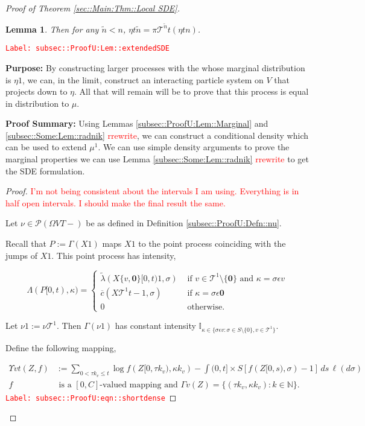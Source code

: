 \documentclass[12pt]{article}
\newcommand{\mb}{\mathbb}
\newcommand{\mc}{\mathcal}
\newcommand{\ov}{\overline}
\newcommand{\te}{\text}
\newcommand{\ep}{\epsilon}
\newcommand{\tr}{\textcolor{red}}
\newcommand{\labe}[1]{\tr{\texttt{Label: #1}}}
\newcommand{\purpose}{\textbf{Purpose: }}
\newcommand{\pfsum}{\textbf{Proof Summary: }}
\newcommand{\ind}{\hspace{24pt}}
\newcommand{\defeq}{:=}								%
\newcommand{\pmsr}{\mc{P}}							%
\renewcommand{\root}{\mathbf{0}}				%
\renewcommand{\v}{v}							%
\renewcommand{\S}{S}							%
\newcommand{\s}{\sigma}							%
\newcommand{\ev}{\ep}							%
\newcommand{\T}{T}								%
\renewcommand{\t}{t}							%
\newcommand{\proj}{\pi}							%
\renewcommand{\tt}{s}							%
\newcommand{\X}{X}								%
\newcommand{\const}{C}							%
\newcommand{\IGrg}{\ov{c}}						%
\newcommand{\tree}{\mc{T}}						%
\newcommand{\sln}[1]{^{#1}}						%
\newcommand{\Sm}{\ell}							%
\newcommand{\alt}[1]{\widetilde{#1}}			%
\newcommand{\m}{\mu}							%
\newcommand{\mm}{\nu}							%
\newcommand{\mmm}{\eta}							%
\newcommand{\XXX}{Z}							%
\newcommand{\rt}{\tau}							%
\renewcommand{\it}{k}							%
\newcommand{\pmap}{\Gamma}						%
\renewcommand{\mark}{\kappa}					%
\newcommand{\rp}{P}								%
\newcommand{\ratee}{\Lambda}					%
\newcommand{\crate}{\alt{\lambda}}				%
\newcommand{\ds}{\Upsilon}						%
\newtheorem{lem}[thms]{Lemma}
\begin{document}
\begin{proof}[Proof of Theorem \ref{sec::Main:Thm::Local SDE}]
\begin{lem}
Then for any \(\alt{n} < n\), \(\mmm{}{\t}{\alt{n}} = \proj{\tree\sln{\alt{n}}}{\t}(\mmm{}{\t}{n})\).
\label{subsec::ProofU:Lem::extendedSDE}
\end{lem}
\labe{subsec::ProofU:Lem::extendedSDE}

\purpose By constructing larger processes with the whose marginal distribution is \(\mmm{}{}{1}\), we can, in the limit, construct an interacting particle system on \(V\) that projects down to \(\mmm{}{}{}\). All that will remain will be to prove that this process is equal in distribution to \(\m{}{}{}\).

\pfsum Using Lemmas \ref{subsec::ProofU:Lem::Marginal} and \ref{subsec::Some:Lem::radnik} \tr{rrewrite}, we can construct a conditional density which can be used to extend \(\mu\sln{1}\). We can use simple density arguments to prove the marginal properties we can use Lemma \ref{subsec::Some:Lem::radnik} \tr{rrewrite} to get the SDE formulation.

\begin{proof}
\tr{I'm not being consistent about the intervals I am using. Everything is in half open intervals. I should make the final result the same.}

Let \(\mm{}{}{} \in \pmsr(\Omega{V}{\T-})\) be as defined in Definition \ref{subsec::ProofU:Defn::nu}.

\ind Recall that \(\rp{} \defeq \pmap{}(\X{}{}{1})\) maps \(\X{}{}{1}\) to the point process coinciding with the jumps of \(\X{}{}{1}\). This point process has intensity,

\[\ratee{}(\rp{}[0,\t),\mark{}) = \begin{cases}
\crate{}{}(\X{\{\v,\root\}}{[0,\t)}{1},\s) &\te{ if } \v\in \tree\sln{1}\setminus\{\root\}\te{ and } \mark{} = \s\ev{\v}\\
\IGrg{}(\X{\tree\sln{1}}{\t-}{1},\s) &\te{ if } \mark{} = \s\ev{\root}\\
0 &\te{ otherwise}.
\end{cases}\]

Let \(\mm{}{}{1} \defeq \mm{\tree\sln{1}}{}{}\). Then \(\pmap{}(\mm{}{}{1})\) has constant intensity \(\mb{I}_{\kappa \in\{\s\ev{\v}:\s\in\S\setminus\{0\},\v\in\tree\sln{1}\}}\). 

\ind Define the following mapping,

\begin{align}
\ds{\v}{\t}(\XXX{}{},f) &\defeq \sum_{0 < \rt{\it}_\v \leq \t} \log{f(\XXX{}{[0,\rt{\it}_\v)},\mark{\it}_\v)} - \int{(0,\t]\times \S} [f(\XXX{}{[0,\tt)},\s) - 1]\,ds\,\Sm(d\s) \label{subsec::ProofU:eqn::shortdense}\\
f&\te{ is a }[0,\const{}] \te{-valued mapping and } \pmap{\v}(\XXX{}{}) = \{(\rt{\it}_\v,\mark{\it}_\v):\it\in\mb{N}\}.\nonumber
\end{align} 
\labe{subsec::ProofU:eqn::shortdense}


\end{proof}
\end{proof}
\end{document}
